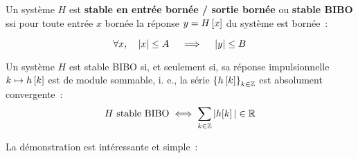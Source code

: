 \begin{definition} Un système $H$ est \textbf{stable en entrée bornée
    / sortie bornée} ou \textbf{stable BIBO} ssi pour
  toute entrée $x$ bornée la réponse $y=H\left[x\right]$ du système est bornée~:

  $$\forall x, \quad \left|x\right|\leq A \quad\implies\quad \left|y\right|\leq B $$
\end{definition}


\begin{theoreme}
  Un système $H$ est stable BIBO si, et seulement si, sa réponse
  impulsionnelle $k\mapsto h\left[k\right]$ est de module sommable, i. e., la série $\left\{h\left[k\right]\right\}_{k\in\mathbb{Z}}$ est absolument convergente~:
  $$ H \text{ stable BIBO} \iff\sum\limits_{k\in\mathbb{Z}} |h\!\left[k\right]| \in \mathbb{R}$$
\end{theoreme}

La démonstration est intéressante et simple~:

